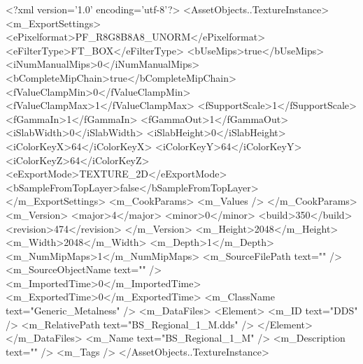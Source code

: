 <?xml version='1.0' encoding='utf-8'?>
<AssetObjects..TextureInstance>
  <m_ExportSettings>
    <ePixelformat>PF_R8G8B8A8_UNORM</ePixelformat>
    <eFilterType>FT_BOX</eFilterType>
    <bUseMips>true</bUseMips>
    <iNumManualMips>0</iNumManualMips>
    <bCompleteMipChain>true</bCompleteMipChain>
    <fValueClampMin>0</fValueClampMin>
    <fValueClampMax>1</fValueClampMax>
    <fSupportScale>1</fSupportScale>
    <fGammaIn>1</fGammaIn>
    <fGammaOut>1</fGammaOut>
    <iSlabWidth>0</iSlabWidth>
    <iSlabHeight>0</iSlabHeight>
    <iColorKeyX>64</iColorKeyX>
    <iColorKeyY>64</iColorKeyY>
    <iColorKeyZ>64</iColorKeyZ>
    <eExportMode>TEXTURE_2D</eExportMode>
    <bSampleFromTopLayer>false</bSampleFromTopLayer>
  </m_ExportSettings>
  <m_CookParams>
    <m_Values />
  </m_CookParams>
  <m_Version>
    <major>4</major>
    <minor>0</minor>
    <build>350</build>
    <revision>474</revision>
  </m_Version>
  <m_Height>2048</m_Height>
  <m_Width>2048</m_Width>
  <m_Depth>1</m_Depth>
  <m_NumMipMaps>1</m_NumMipMaps>
  <m_SourceFilePath text="" />
  <m_SourceObjectName text="" />
  <m_ImportedTime>0</m_ImportedTime>
  <m_ExportedTime>0</m_ExportedTime>
  <m_ClassName text="Generic_Metalness" />
  <m_DataFiles>
    <Element>
      <m_ID text="DDS" />
      <m_RelativePath text="BS_Regional_1_M.dds" />
    </Element>
  </m_DataFiles>
  <m_Name text="BS_Regional_1_M" />
  <m_Description text="" />
  <m_Tags />
</AssetObjects..TextureInstance>